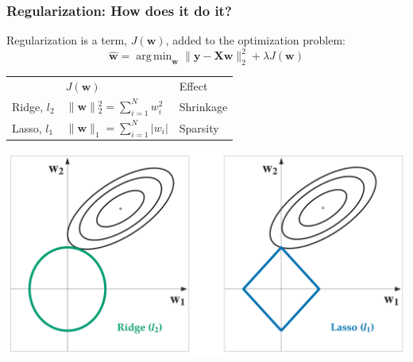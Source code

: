 \documentclass[11pt]{beamer}
\DeclareMathOperator*{\argmin}{arg\,min}
\begin{document}
\begin{frame}
  \frametitle{Regularization: How does it do it?}
  Regularization is a term, \(J(\mathbf{w})\), added to the optimization problem:
  \[\hat{\mathbf{w}} = \argmin_{\mathbf{w}} \lVert \mathbf{y} - \mathbf{Xw}
    \rVert^{2}_{2} + \lambda{}J(\mathbf{w})\]
  \begin{center}
    \begin{tabular}[h]{@{}lll@{}}
      & \(J(\mathbf{w})\) & Effect \\
      \cmidrule(r){2-3}
      Ridge, \(l_{2}\) & \(\lVert{\mathbf{w}}\rVert{}^{2}_{2} = \sum_{i=1}^{N}w_{i}^{2}\) & Shrinkage \\
      Lasso, \(l_{1}\) & \(\lVert{\mathbf{w}}\rVert_{1} = \sum_{i=1}^{N}\left| w_{i} \right|\) & Sparsity \\
    \end{tabular}
  \end{center}
  \begin{center}
    \includegraphics[scale=0.25]{figures/l1_l2_geometry.png}
  \end{center}
\end{frame}
\end{document}
